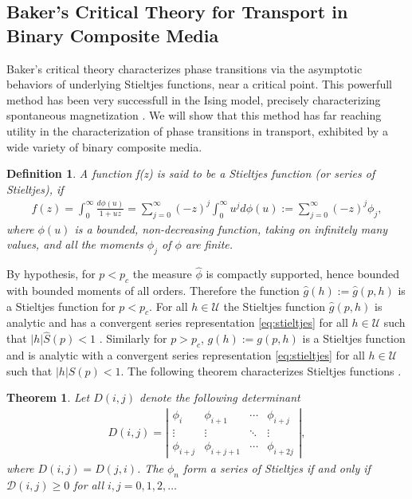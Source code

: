 \documentclass[english,12pt,jmp,graphicx]{revtex4-1}
\newtheorem{theorem}{Theorem}[section]
\newtheorem{definition}{Definition}[section]
\newcommand{\ph}{\hat{\phi}}
\begin{document}
\subsection{Baker's Critical Theory for Transport in Binary Composite
  Media}
%
Baker's critical theory characterizes phase transitions via the
asymptotic behaviors of underlying Stieltjes functions, near a critical 
point. This powerfull method has been very successfull in the Ising
model, precisely characterizing spontaneous magnetization
\cite{Baker-1990}. We will show that this method has far reaching
utility in the characterization of phase transitions in transport,
exhibited by a wide variety of binary composite media.   
%
\begin{definition}  \label{def:stieltjes}
  A function f(z) is said to be a \emph{Stieltjes function} (or
  \emph{series of Stieltjes}), if 
  \begin{align} \label{eq:stieltjes}
    f(z)=\int_0^\infty\frac{d\phi(u)}{1+uz}
    =\sum_{j =0}^\infty(-z)^j\int_0^\infty u^jd\phi(u)
    :=\sum_{j =0}^\infty(-z)^j\phi_j,
  \end{align}
  where $\phi(u)$ is a bounded, non-decreasing function, taking on
  infinitely many values, and all the moments $\phi_j$ of $\phi$ are
  finite.  
\end{definition}
%
By hypothesis, for $p<p_c$ the measure $\ph$ is compactly supported,
hence bounded with bounded moments of all orders. Therefore the
function $\hat{g}(h):=\hat{g}(p,h)$ is a Stieltjes function for
$p<p_c$. For all $h\in\mathcal{U}$ the Stieltjes function $\hat{g}(p,h)$
is analytic and has a convergent series representation
\eqref{eq:stieltjes} for all $h\in\mathcal{U}$ such that
$|h|\hat{S}(p)<1$ \cite{Golden:PRL-3935,Golden:CMP-473}. Similarly for
$p>p_c$, $g(h):=g(p,h)$ is a Stieltjes function and is analytic
with a convergent series representation \eqref{eq:stieltjes} for all
$h\in\mathcal{U}$ such that $|h|S(p)<1$. The following theorem
characterizes Stieltjes functions \cite{Baker-1990}.  
% 
\begin{theorem} \label{thm:stieltjes_Characterization}
   Let $D(i,j)$ denote the following determinant
    \begin{align} \label{eq:Detf} 
     D(i,j) = \left|
                 \begin{matrix}
                   \phi_i&\phi_{i+1}&\cdots&\phi_{i+j}\\ 
                   \vdots&\vdots&\ddots&\vdots\\
                   \phi_{i+j}&\phi_{i+j+1}&\cdots&\phi_{i+2j}                            
                   \end{matrix}
              \right| ,    
   \end{align}
   where $D(i,j)=D(j,i)$. The $\phi_n$ form a series of Stieltjes if and
   only if $\mathcal{D}(i,j) \geq 0$ for all $i,j =0,1,2,\ldots$

 \end{theorem}
\end{document}
